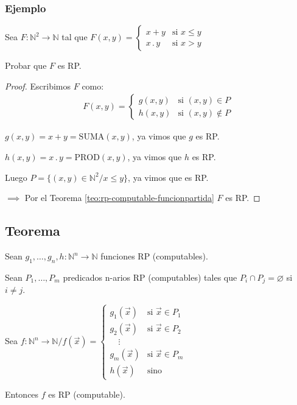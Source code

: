 \subsubsection{Ejemplo}

Sea $F: \mathbb{N}^2 \to \mathbb{N}$ tal que $F(x,y) = \begin{cases}
    x+y & \text{si } x \leq y \\
    x\, . \, y & \text{si } x > y 
\end{cases}$

Probar que $F$ es RP.

\begin{proof} \phantom{.}

    Escribimos $F$ como:
    \begin{gather*}
        F(x,y) = 
        \begin{cases}
            g(x,y) & \text{si } (x,y) \in {P}\\
            h(x,y) & \text{si } (x,y) \notin {P}
        \end{cases}
    \end{gather*}

    $g(x,y) = x+y = \mathrm{SUMA}(x, y)$, ya vimos que $g$ es RP.

    $h(x,y) = x \, . \, y = \mathrm{PROD}(x, y)$, ya vimos que $h$ es RP.

    Luego $P = \{ (x,y) \in \mathbb{N}^2 / x \leq y \}$, ya vimos que es RP.

    $\implies$ Por el Teorema \ref{teo:rp-computable-funcionpartida} $F$ es RP.
\end{proof}

\subsection{Teorema}

\begin{teorema}{}{}
    Sean $g_1, \dotsc, g_n,h : \mathbb{N}^n \to \mathbb{N}$ funciones RP
    (computables).

    Sean $P_1, \dotsc, P_m$ predicados n-arios RP (computables) tales que
    $P_i \cap P_j = \varnothing$ si $i \neq j$.

    Sea $f: \mathbb{N}^n \to \mathbb{N} / f(\overrightarrow{x}) =
    \begin{cases}
        g_1(\overrightarrow{x}) & \text{si } \overrightarrow{x} \in P_1 \\
        g_2(\overrightarrow{x}) & \text{si } \overrightarrow{x} \in P_2 \\
        \quad \vdots & \\
        g_m(\overrightarrow{x}) & \text{si } \overrightarrow{x} \in P_m \\
        h(\overrightarrow{x}) & \text{sino}
    \end{cases}$

    \medskip

    Entonces $f$ es RP (computable).
\end{teorema}

